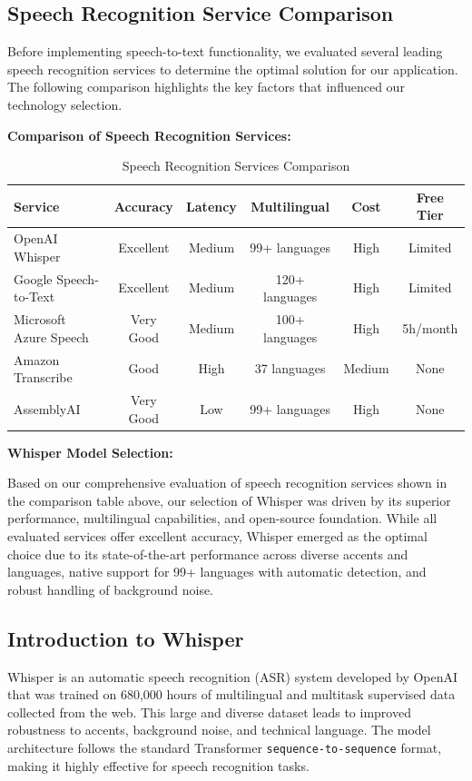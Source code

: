 \documentclass[12pt,a4paper]{article}
\begin{document}
\subsection{Speech Recognition Service Comparison}

Before implementing speech-to-text functionality, we evaluated several leading speech recognition services to determine the optimal solution for our application. The following comparison highlights the key factors that influenced our technology selection.

\textbf{Comparison of Speech Recognition Services:}
\begin{table}[H]
\centering
\begin{tabular}{|l|c|c|c|c|c|}
\hline
\textbf{Service} & \textbf{Accuracy} & \textbf{Latency} & \textbf{Multilingual} & \textbf{Cost} & \textbf{Free Tier} \\
\hline
OpenAI Whisper & Excellent & Medium & 99+ languages & High & Limited \\
\hline
Google Speech-to-Text & Excellent & Medium & 120+ languages & High & Limited \\
\hline
Microsoft Azure Speech & Very Good & Medium & 100+ languages & High & 5h/month \\
\hline
Amazon Transcribe & Good & High & 37 languages & Medium & None \\
\hline
AssemblyAI & Very Good & Low & 99+ languages & High & None \\
\hline
\end{tabular}
\caption{Speech Recognition Services Comparison}
\end{table}

\textbf{Whisper Model Selection:}

Based on our comprehensive evaluation of speech recognition services shown in the comparison table above, our selection of Whisper was driven by its superior performance, multilingual capabilities, and open-source foundation. While all evaluated services offer excellent accuracy, Whisper emerged as the optimal choice due to its state-of-the-art performance across diverse accents and languages, native support for 99+ languages with automatic detection, and robust handling of background noise.


\subsection{Introduction to Whisper}

Whisper is an automatic speech recognition (ASR) system developed by OpenAI that was trained on 680,000 hours of multilingual and multitask supervised data collected from the web. This large and diverse dataset leads to improved robustness to accents, background noise, and technical language. The model architecture follows the standard Transformer \texttt{sequence-to-sequence} format, making it highly effective for speech recognition tasks.
\end{document}
